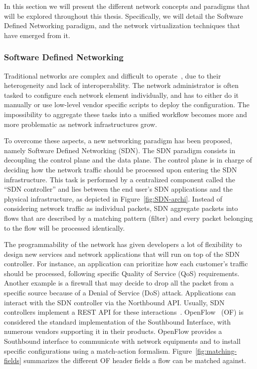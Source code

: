 In this section we will present the different network concepts and paradigms that will be explored throughout this thesis.
Specifically, we will detail the Software Defined Networking paradigm, and the network virtualization techniques that have emerged from it.

\subsubsection{Software Defined Networking}

Traditional networks are complex and difficult to operate~\cite{complexnetworks}, due to their heterogeneity and lack of interoperability. The network administrator is often tasked to configure each network element individually, and has to either do it manually or use low-level vendor specific scripts to deploy the configuration. The impossibility to aggregate these tasks into a unified workflow becomes more and more problematic as network infrastructures grow.

To overcome these aspects, a new networking paradigm has been proposed, namely Software Defined Networking (SDN).
The SDN paradigm consists in decoupling the control plane and the data plane.
The control plane is in charge of deciding how the network traffic should be processed upon entering the SDN infrastructure.
This task is performed by a centralized component called the ``SDN controller'' and lies between the end user's SDN applications and the physical infrastructure, as depicted in Figure~\ref{fig:SDN-archi}. Instead of considering network traffic as individual packets, SDN aggregate packets into flows that are described by a matching pattern (filter) and every packet belonging to the flow will be processed identically. 



The programmability of the network has given developers a lot of flexibility to design new services and network applications that will run on top of the SDN controller.
For instance, an application can prioritize how each customer's traffic should be processed, following specific Quality of Service (QoS) requirements.
Another example is a firewall that may decide to drop all the packet from a specific source because of a Denial of Service (DoS) attack.
Applications can interact with the SDN controller via the Northbound API.
Usually, SDN controllers implement a REST API for these interactions~\cite{onos-Berde2014a,opendaylight,floodlight}.
OpenFlow~\cite{Openflow-McKeown2008} (OF) is considered the standard implementation of the Southbound Interface, with numerous vendors supporting it in their products.
OpenFlow provides a Southbound interface to communicate with network equipments and to install specific configurations using a match-action formalism.
Figure~\ref{fig:matching-fields} summarizes the different OF header fields a flow can be matched against.

